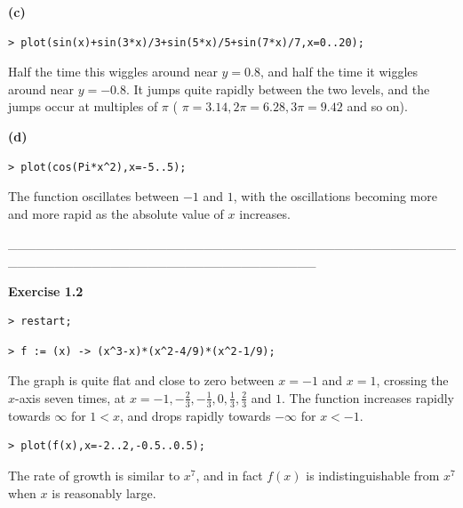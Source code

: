 \documentclass{article}
\begin{document}
\begin{Maple Normal}
\textbf{(c)}
\end{Maple Normal}
\begin{lstlisting}
> plot(sin(x)+sin(3*x)/3+sin(5*x)/5+sin(7*x)/7,x=0..20);
\end{lstlisting}
\begin{Maple Normal}
Half the time this wiggles around near 
$y = 0.8$, and half the time it wiggles around near 
$y =- 0.8$.  It jumps quite rapidly between the two levels, and the jumps occur at multiples of 
$\pi$ (
$\pi= 3.14,2 \pi= 6.28,3 \pi= 9.42$ and so on).
\end{Maple Normal}
\begin{Maple Normal}
\textbf{(d)}
\end{Maple Normal}
\begin{lstlisting}
> plot(cos(Pi*x^2),x=-5..5);
\end{lstlisting}
\begin{Maple Normal}
The function oscillates between 
$-1$ and 
$1$, with the oscillations becoming more and more rapid as the absolute value of 
$x$ increases.
\end{Maple Normal}
\begin{Maple Normal}
\_\_\_\_\_\_\_\_\_\_\_\_\_\_\_\_\_\_\_\_\_\_\_\_\_\_\_\_\_\_\_\_\_\_\_\_\_\_\_\_\_\_\_\_\_\_\_\_\_\_\_\_\_\_\_\_\_\_\_\_\_\_\_\_\_\_\_\_\_\_\_\_\_\_\_\_\_\_\_\_\_
\end{Maple Normal}
\begin{Maple Heading 2}
\textbf{Exercise 1.2}
\end{Maple Heading 2}
\begin{lstlisting}
> restart;
\end{lstlisting}
\begin{lstlisting}
> f := (x) -> (x^3-x)*(x^2-4/9)*(x^2-1/9);
\end{lstlisting}
\begin{Maple Normal}
The graph is quite flat and close to zero between 
$x =-1$ and 
$x =1$, crossing the 
$ x$-axis seven times, at 
$x =-1,-\frac{2}{3},-\frac{1}{3},0,\frac{1}{3},\frac{2}{3}$  and 
$1$.  The function increases rapidly towards 
$\infty$ for 
$1<x$, and drops rapidly towards 
$-\infty$ for 
$x <-1$.  
\end{Maple Normal}
\begin{lstlisting}
> plot(f(x),x=-2..2,-0.5..0.5);
\end{lstlisting}
\begin{Maple Normal}
The rate of growth is similar to 
$x^{7}$, and in fact 
$f (x)$ is indistinguishable from 
$x^{7}$ when 
$x$ is reasonably large.
\end{Maple Normal}
\end{document}
